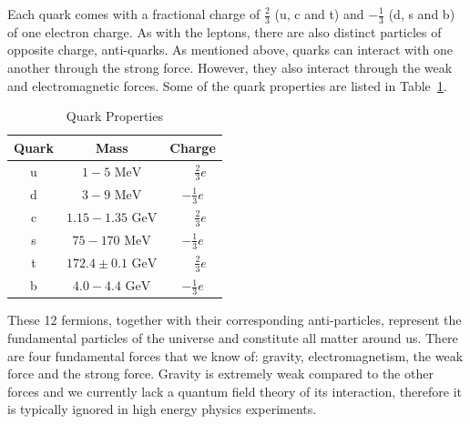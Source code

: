 Each quark comes with a fractional charge of $\frac{2}{3}$ (u, c and t) and $-\frac{1}{3}$ (d, s and b) of one electron charge. As with the leptons, there are also distinct particles of opposite charge, anti-quarks. As mentioned above, quarks can interact with one another through the strong force. However, they also interact through the weak and electromagnetic forces.
Some of the quark properties are listed in Table~\ref{table:theory:quarkprop}.
\begin{table}
\begin{center}
\begin{tabular}{|c|c|c|}%
\hline
Quark & Mass & Charge \\%
\hline
u & $1-5 \mbox{ MeV}$         & $\phantom{-}\frac{2}{3} e$  \\%
d & $3-9 \mbox{ MeV}$         & $-\frac{1}{3} e$            \\%
c & $1.15-1.35 \mbox{ GeV}$   & $\phantom{-}\frac{2}{3} e$  \\%
s & $75-170 \mbox{ MeV}$      & $-\frac{1}{3}e$             \\%
t & $172.4\pm 0.1 \mbox{ GeV}$ & $\phantom{-}\frac{2}{3} e$  \\%
b & $4.0-4.4 \mbox{ GeV}$     & $-\frac{1}{3} e$            \\%
\hline
\end{tabular}
\end{center}
\caption{Quark Properties}
\label{table:theory:quarkprop}
\end{table}
These 12 fermions, together with their corresponding anti-particles, represent the fundamental particles of the universe and constitute all matter around us. There are four fundamental forces that we know of: gravity, electromagnetism, the weak force and the strong force. Gravity is extremely weak compared to the other forces and we currently lack a quantum field theory of its interaction, therefore it is typically ignored in high energy physics experiments. 
